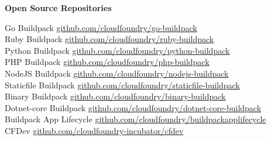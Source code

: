 \documentclass[10pt,a4papaer]{article}
\begin{document}
{\selectfont
	
	\begin{center}	
		{\huge\textbf{Open Source Repositories}} \\
	\end{center}
	
	Go Buildpack \href{https://github.com/cloudfoundry/go-buildpack}{github.com/cloudfoundry/go-buildpack}\\
	
	Ruby Buildpack \href{https://github.com/cloudfoundry/ruby-buildpack}{github.com/cloudfoundry/ruby-buildpack}\\
	
	Python Buildpack \href{https://github.com/cloudfoundry/python-buildpack}{github.com/cloudfoundry/python-buildpack}\\
	
	PHP Buildpack \href{https://github.com/cloudfoundry/php-buildpack}{github.com/cloudfoundry/php-buildpack}\\
	
	NodeJS Buildpack \href{https://github.com/cloudfoundry/nodejs-buildpack}{github.com/cloudfoundry/nodejs-buildpack}\\
	
	Staticfile Buildpack \href{https://github.com/cloudfoundry/staticfile-buildpack}{github.com/cloudfoundry/staticfile-buildpack}\\
	
	Binary Buildpack \href{https://github.com/cloudfoundry/binary-buildpack}{github.com/cloudfoundry/binary-buildpack}\\
	
	Dotnet-core Buildpack \href{https://github.com/cloudfoundry/dotnet-core-buildpack}{github.com/cloudfoundry/dotnet-core-buildpack}\\
	
	Buildpack App Lifecycle
	\href{https://github.com/cloudfoundry/buildpackapplifecycle}{github.com/cloudfoundry/buildpackapplifecycle}\\
	
	CFDev \href{https://github.com/cloudfoundry-incubator/cfdev}{github.com/cloudfoundry-incubator/cfdev}
	
}
\end{document}

